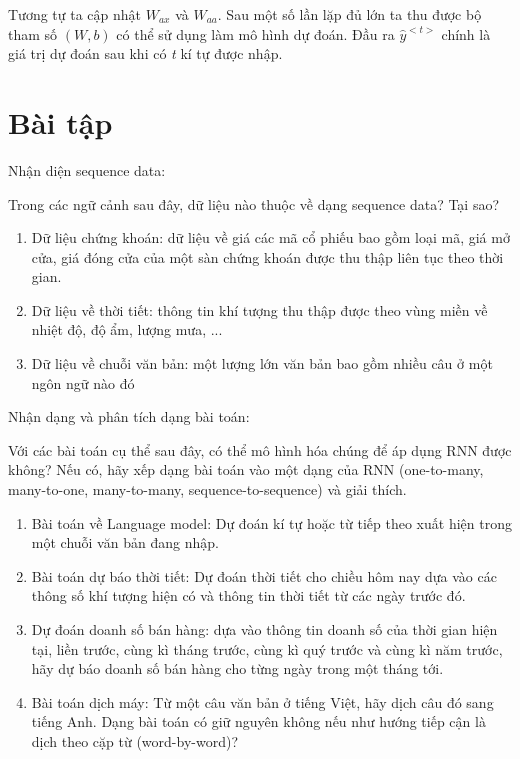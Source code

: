 Tương tự ta cập nhật $W_{ax}$ và $W_{aa}$. Sau một số lần lặp đủ lớn ta thu được bộ tham số $(W, b)$ có thể sử dụng làm mô hình dự đoán. Đầu ra $\widehat{y}^{<t>}$ chính là giá trị dự đoán sau khi có \textit{t} kí tự được nhập. 

\newpage
\section{Bài tập}
\begin{exer}
Nhận diện sequence data: 

Trong các ngữ cảnh sau đây, dữ liệu nào thuộc về dạng sequence data? Tại sao?
    \begin{enumerate}[label=\alph*)]
    \item Dữ liệu chứng khoán: dữ liệu về giá các mã cổ phiếu bao gồm loại mã, giá mở cửa, giá đóng cửa của một sàn chứng khoán được thu thập liên tục theo thời gian.
    \item Dữ liệu về thời tiết: thông tin khí tượng thu thập được theo vùng miền về nhiệt độ, độ ẩm, lượng mưa, ... 
    \item Dữ liệu về chuỗi văn bản: một lượng lớn văn bản bao gồm nhiều câu ở một ngôn ngữ nào đó
    \end{enumerate}
\end{exer}

\begin{exer}
Nhận dạng và phân tích dạng bài toán: 

Với các bài toán cụ thể sau đây, có thể mô hình hóa chúng để áp dụng RNN được không? Nếu có, hãy xếp dạng bài toán vào một dạng của RNN (one-to-many, many-to-one, many-to-many, sequence-to-sequence) và giải thích.
    \begin{enumerate}[label=\alph*)]
    \item Bài toán về Language model: Dự đoán kí tự hoặc từ tiếp theo xuất hiện trong một chuỗi văn bản đang nhập.
    \item Bài toán dự báo thời tiết: Dự đoán thời tiết cho chiều hôm nay dựa vào các thông số khí tượng hiện có và thông tin thời tiết từ các ngày trước đó.
    \item Dự đoán doanh số bán hàng: dựa vào thông tin doanh số của thời gian hiện tại, liền trước, cùng kì tháng trước, cùng kì quý trước và cùng kì năm trước, hãy dự báo doanh số bán hàng cho từng ngày trong một tháng tới.
    \item Bài toán dịch máy: Từ một câu văn bản ở tiếng Việt, hãy dịch câu đó sang tiếng Anh. Dạng bài toán có giữ nguyên không nếu như hướng tiếp cận là dịch theo cặp từ (word-by-word)?
    \end{enumerate}
\end{exer}

